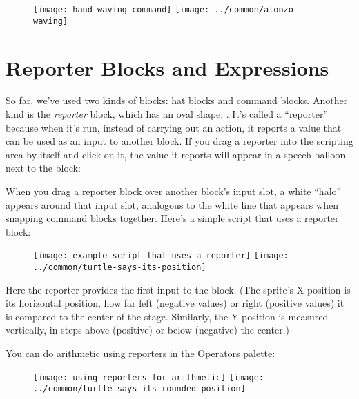 \documentclass{report}
\begin{document}
\begin{figure}[H]
\centering
\texttt{[image: hand-waving-command]}%
\hspace{2em}%
\texttt{[image: ../common/alonzo-waving]}
\end{figure}

\section{Reporter Blocks and Expressions}

So far, we've used two kinds of blocks: hat blocks and command blocks. Another kind is the \emph{reporter} block, which has an oval shape: . It's called a ``reporter'' because when it's run, instead of carrying out an action, it reports a value that can be used as an input to another block. If you drag a reporter into the scripting area by itself and click on it, the value it reports will appear in a speech balloon next to the block:\nopagebreak


When you drag a reporter block over another block's input slot, a white ``halo'' appears around that input slot, analogous to the white line that appears when snapping command blocks together. Here's a simple script that uses a reporter block:\nopagebreak

\begin{figure}[H]
\centering
\texttt{[image: example-script-that-uses-a-reporter]}%
\hspace{2em}%
\texttt{[image: ../common/turtle-says-its-position]}
\end{figure}

Here the  reporter provides the first input to the  block. (The sprite's X position is its horizontal position, how far left (negative values) or right (positive values) it is compared to the center of the stage. Similarly, the Y position is measured vertically, in steps above (positive) or below (negative) the center.)

You can do arithmetic using reporters in the Operators palette:\nopagebreak

\begin{figure}[H]
\centering
\texttt{[image: using-reporters-for-arithmetic]}%
\hspace{2em}%
\texttt{[image: ../common/turtle-says-its-rounded-position]}
\end{figure}
\end{document}
